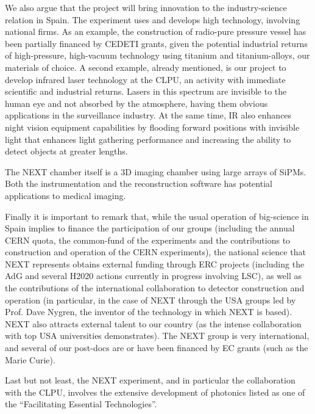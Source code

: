 We also argue that the project will bring innovation to the industry-science relation in Spain. The experiment uses and develops high technology, involving national firms. As an example, the construction of radio-pure pressure vessel has been partially financed by CEDETI grants, given the potential industrial returns of high-pressure, high-vacuum technology using titanium and titanium-alloys, our materials of choice. A second example, already mentioned, is our project to develop infrared laser technology at the CLPU, an activity with immediate scientific and industrial returns. Lasers in this spectrum are invisible to the human eye and not absorbed by the atmosphere, having them obvious applications in the surveillance industry. At the same time, IR also enhances night vision equipment capabilities by flooding forward positions with invisible light that enhances light gathering performance and increasing the ability to detect objects at greater lengths.

 The NEXT chamber itself is a 3D imaging chamber using large arrays of SiPMs. Both the instrumentation and the reconstruction software has potential applications to medical imaging. 

Finally it is important to remark that, while the usual operation of big-science in Spain implies to finance the participation of our groups (including the annual CERN quota, the common-fund of the experiments and the contributions to construction and operation of the CERN experiments), the national science that NEXT represents obtains external funding through ERC projects (including the AdG and several H2020 actions currently in progress involving LSC), as well as the contributions of the international collaboration to detector construction and operation (in particular, in the case of NEXT through the USA groups led by Prof. Dave Nygren, the inventor of the technology in which NEXT is based). NEXT also attracts external talent to our country (as the intense collaboration with top USA universities demonstrates). The NEXT group is very international, and several of our post-docs are or have been financed by EC grants (such as the Marie Curie). 

Last but not least, the NEXT experiment, and in particular the collaboration with the CLPU, involves the extensive development of photonics listed as one of the  ``Facilitating Essential Technologies''.